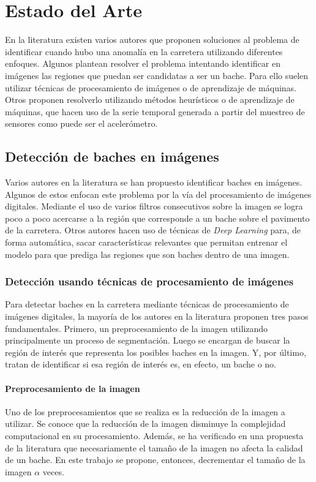 \chapter{Estado del Arte}\label{chapter:state-of-the-art}
En la literatura existen varios autores que proponen soluciones al problema de identificar cuando hubo una anomalía en la carretera utilizando
diferentes enfoques. Algunos plantean resolver el problema intentando identificar en imágenes las regiones que puedan ser candidatas a ser un 
bache. Para ello suelen utilizar técnicas de procesamiento de imágenes o de aprendizaje de máquinas. Otros proponen resolverlo utilizando métodos 
heurísticos o de aprendizaje de máquinas, que hacen uso de la serie temporal generada a partir del muestreo de sensores como puede ser el acelerómetro. 

\section{Detección de baches en imágenes}
Varios autores en la literatura se han propuesto identificar baches en imágenes. Algunos de estos enfocan este problema por la vía del
procesamiento de imágenes digitales. Mediante el uso de varios filtros consecutivos  sobre la imagen se logra poco a poco acercarse 
a la región que corresponde a un bache sobre el pavimento de la carretera.  Otros autores hacen uso de técnicas de \emph{Deep Learning}
para, de forma automática, sacar características relevantes que permitan entrenar el modelo para que prediga las regiones 
que son baches dentro de una imagen.

	\subsection{Detección usando técnicas de procesamiento de imágenes}

		Para detectar baches en la carretera mediante técnicas de procesamiento de imágenes digitales, la mayoría de los autores  en la literatura 
		proponen tres pasos fundamentales. Primero, un preprocesamiento de la imagen utilizando principalmente un proceso de segmentación. Luego 
		se encargan de buscar la región de interés que representa los posibles baches en la imagen. Y, por último, tratan de identificar si esa 
		región de interés es, en efecto, un bache o no. 
		
		\subsubsection{Preprocesamiento de la imagen}
		Uno de los preprocesamientos que se realiza es la reducción de la imagen a utilizar. Se conoce que la reducción de la imagen  disminuye 
		la complejidad computacional en su procesamiento. Además, se ha verificado en una propuesta de la literatura 
		que necesariamente el tamaño de la imagen no afecta la calidad de un bache.  En este trabajo se propone, entonces, 
		decrementar el tamaño de la imagen $\alpha$ veces.

